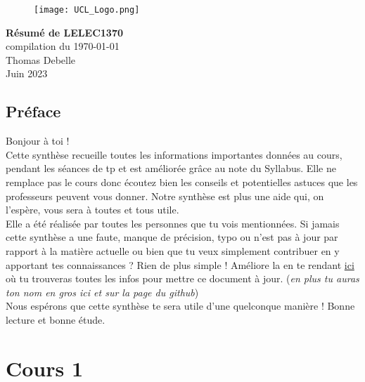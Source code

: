 \documentclass{report}
\begin{document}
\begin{titlepage}
    \begin{figure}
        \texttt{[image: UCL\_Logo.png]}
        \label{fig:my_label}
    \end{figure}

    \hspace*{100cm}
    \centering
    \vspace*{7cm}

    {\Huge \textbf{Résumé de LELEC1370}}\\
    \vspace*{0.25cm}
    compilation du \today\\
    \vspace*{0.25cm}
    \Large{Thomas Debelle}\\

    \vspace*{9.5cm}
    {\Large Juin 2023}
\end{titlepage}


\tableofcontents
\newpage

\section*{Préface}

Bonjour à toi !\\

Cette synthèse recueille toutes les informations importantes données au cours, pendant les séances de tp et est améliorée grâce au note du Syllabus. Elle ne remplace pas le cours donc écoutez bien les conseils et potentielles astuces que les professeurs peuvent vous donner. Notre synthèse est plus une aide qui, on l'espère, vous sera à toutes et tous utile.\\

Elle a été réalisée par toutes les personnes que tu vois mentionnées. Si jamais cette synthèse a une faute, manque de précision, typo ou n'est pas à jour par rapport à la matière actuelle ou bien que tu veux simplement contribuer en y apportant tes connaissances ? Rien de plus simple ! Améliore la en te rendant \href{http://www.github.com/Tfloow/Q4_EPL}{ici} où tu trouveras toutes les infos pour mettre ce document à jour. (\textit{en plus tu auras ton nom en gros ici et sur la page du github})\\

Nous espérons que cette synthèse te sera utile d'une quelconque manière ! Bonne lecture et bonne étude.


\chapter{Cours 1}
\end{document}
